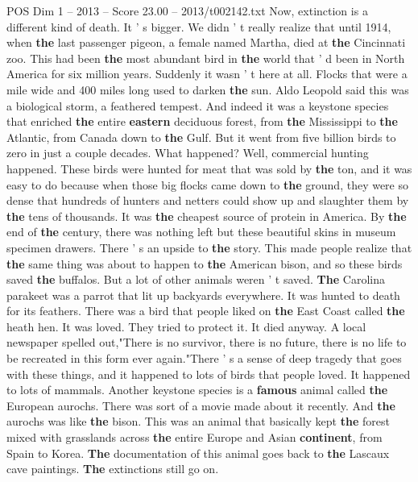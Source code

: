 \begin{textsample}{POS Dim 1 – 2013 – Score 23.00 – 2013/t002142.txt}  \label{ex:f1_pos_042}
Now, extinction is a different kind of death.
It ' s bigger.
We didn ' t really realize that until 1914, when \textbf{the} last passenger pigeon, a female named Martha, died at \textbf{the} Cincinnati zoo.
This had been \textbf{the} most abundant bird in \textbf{the} world that ' d been in North America for six million years.
Suddenly it wasn ' t here at all.
Flocks that were a mile wide and 400 miles long used to darken \textbf{the} sun.
Aldo Leopold said this was a biological storm, a feathered tempest.
And indeed it was a keystone species that enriched \textbf{the} entire \textbf{eastern} deciduous forest, from \textbf{the} Mississippi to \textbf{the} Atlantic, from Canada down to \textbf{the} Gulf.
But it went from five billion birds to zero in just a couple decades.
What happened?
Well, commercial hunting happened.
These birds were hunted for meat that was sold by \textbf{the} ton, and it was easy to do because when those big flocks came down to \textbf{the} ground, they were so dense that hundreds of hunters and netters could show up and slaughter them by \textbf{the} tens of thousands.
It was \textbf{the} cheapest source of protein in America.
By \textbf{the} end of \textbf{the} century, there was nothing left but these beautiful skins in museum specimen drawers.
There ' s an upside to \textbf{the} story.
This made people realize that \textbf{the} same thing was about to happen to \textbf{the} American bison, and so these birds saved \textbf{the} buffalos.
But a lot of other animals weren ' t saved. \textbf{The} Carolina parakeet was a parrot that lit up backyards everywhere.
It was hunted to death for its feathers.
There was a bird that people liked on \textbf{the} East Coast called \textbf{the} heath hen.
It was loved.
They tried to protect it.
It died anyway.
A local newspaper spelled out,"There is no survivor, there is no future, there is no life to be recreated in this form ever again."There ' s a sense of deep tragedy that goes with these things, and it happened to lots of birds that people loved.
It happened to lots of mammals.
Another keystone species is a \textbf{famous} animal called \textbf{the} European aurochs.
There was sort of a movie made about it recently.
And \textbf{the} aurochs was like \textbf{the} bison.
This was an animal that basically kept \textbf{the} forest mixed with grasslands across \textbf{the} entire Europe and Asian \textbf{continent}, from Spain to Korea. \textbf{The} documentation of this animal goes back to \textbf{the} Lascaux cave paintings. \textbf{The} extinctions still go on.

\end{textsample}
